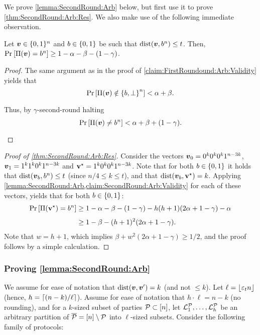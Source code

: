 We prove \cref{lemma:SecondRound:Arb} below, but first use it to prove \cref{thm:SecondRound:Arb:Res}. We also make use of the following immediate observation.
\begin{claim}\label{claim:SecondRound:Arb:Validity}
	Let ${ \boldsymbol{v}} \in {\{0,1\}^n}$  and $b \in \{0,1\}$ be such that $\mathrm{dist}({ \boldsymbol{v}},b^n) \le t$. Then,
	$\Pr_{}\left[\Pi({ \boldsymbol{v}}) = b^n \right] \ge 1 - \alpha - \beta - (1- \gamma)$.
\end{claim}
\begin{proof}
	The same argument as in the proof of \cref{claim:FirstRoundound:Arb:Validity} yields that
	\begin{align*}
	\Pr_{}\left[\Pi({ \boldsymbol{v}}) \notin \left\{b,\bot\right\}^n\right] < \alpha + \beta.
	\end{align*}
	Thus, by $\gamma$-second-round halting
	\begin{align*}
	\Pr_{}\left[\Pi({ \boldsymbol{v}}) \ne b^n\right] < \alpha + \beta + (1-\gamma).
	\end{align*}
\end{proof}
\begin{proof}[Proof of \cref{thm:SecondRound:Arb:Res}]
Consider the  vectors ${ \boldsymbol{v}}_0= 0^k 0^k 0^k 1^{n-3k}$, ${ \boldsymbol{v}}_1= 1^k 1^k 0^k 1^{n-3k}$ and $\mathbf{v}^{\star} =1^k 0^k 0^k 1^{n-3k}$. Note that for both $b\in \{0,1\}$   it holds that $\mathrm{dist}({ \boldsymbol{v}}_b,b^n)\le t$  (since $n/4 \leq k\leq t$),  and that $\mathrm{dist}({ \boldsymbol{v}}_b,\mathbf{v}^{\star})=k$. Applying \cref{lemma:SecondRound:Arb,claim:SecondRound:Arb:Validity} for each of these vectors, yields that for both $b\in \{0,1\}$:
\begin{align*}
\Pr_{}\left[\Pi(\mathbf{v}^{\star}) = b^n\right] &\ge 1- \alpha - \beta -(1- \gamma) - h(h+1)(2\alpha + 1-\gamma) -\alpha\\
&\ge 1- \beta - (h+1)^2(2\alpha + 1-\gamma).
\end{align*}
Note that $w=h+1$, which implies $\beta +w^2(2\alpha + 1-\gamma) \ge 1/2$, and the proof follows by a simple calculation.
\end{proof}

\subsubsection{Proving \cref{lemma:SecondRound:Arb}}
We assume for ease of notation that $\mathrm{dist}({ \boldsymbol{v}},{ \boldsymbol{v}}')=k$  (and not $\le k$). Let $\ell= \left \lfloor\varepsilon_t n \right \rfloor$  (hence, $h = \left\lceil (n-k)/\ell \right\rceil$). Assume for ease of notation that $h\cdot \ell = n-k $ (\ie no rounding), and for a $k$-sized subset of parties $\mathcal{P} \subset [n]$, let $ {\cal{L}}^{\mathcal{P}}_1,\dots,{\cal{L}}_h^{\mathcal{P}}$ be an arbitrary partition of ${\overline{\mathcal{P}}} = [n] \setminus \mathcal{P}$ into $\ell$-sized subsets. Consider the following family of protocols:


